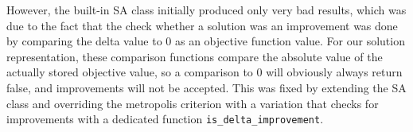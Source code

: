 \documentclass{scrartcl}
\begin{document}
\begin{enumerate}
		However, the built-in SA class initially produced only very bad results, which was due to the fact that the check whether a solution was an improvement was done by comparing the delta value to 0 as an objective function value. For our solution representation, these comparison functions compare the absolute value of the actually stored objective value, so a comparison to 0 will obviously always return false, and improvements will not be accepted. This was fixed by extending the SA class and overriding the metropolis criterion with a variation that checks for improvements with a dedicated function \verb|is_delta_improvement|.
	\end{enumerate}
\end{document}
